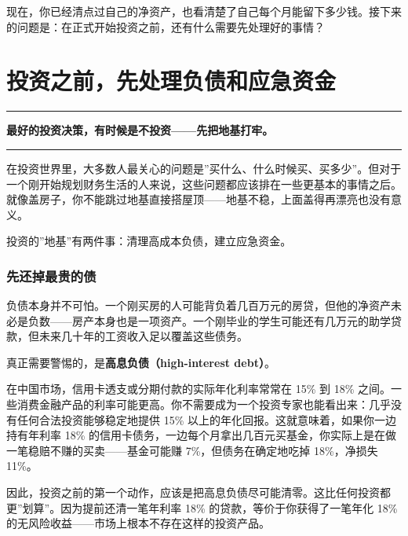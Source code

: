 \documentclass[a4paper,11pt,oneside,fontset=none,UTF8,zihao=-4]{ctexbook}
\begin{document}
现在，你已经清点过自己的净资产，也看清楚了自己每个月能留下多少钱。接下来的问题是：在正式开始投资之前，还有什么需要先处理好的事情？

\newpage

\chapter{投资之前，先处理负债和应急资金}\label{ux6295ux8d44ux4e4bux524dux5148ux5904ux7406ux8d1fux503aux548cux5e94ux6025ux8d44ux91d1}

\begin{center}{\color{dh-bronze}\rule{0.2\textwidth}{0.5pt}}\end{center}

\begin{dhquote}
\textbf{最好的投资决策，有时候是不投资------先把地基打牢。}
\end{dhquote}

\begin{center}{\color{dh-bronze}\rule{0.2\textwidth}{0.5pt}}\end{center}

在投资世界里，大多数人最关心的问题是''买什么、什么时候买、买多少''。但对于一个刚开始规划财务生活的人来说，这些问题都应该排在一些更基本的事情之后。就像盖房子，你不能跳过地基直接搭屋顶------地基不稳，上面盖得再漂亮也没有意义。

投资的''地基''有两件事：清理高成本负债，建立应急资金。

\subsection{先还掉最贵的债}\label{ux5148ux8fd8ux6389ux6700ux8d35ux7684ux503a}

负债本身并不可怕。一个刚买房的人可能背负着几百万元的房贷，但他的净资产未必是负数------房产本身也是一项资产。一个刚毕业的学生可能还有几万元的助学贷款，但未来几十年的工资收入足以覆盖这些债务。

真正需要警惕的，是\textbf{高息负债（high-interest debt）}。

在中国市场，信用卡透支或分期付款的实际年化利率常常在 15\% 到 18\%
之间。一些消费金融产品的利率可能更高。你不需要成为一个投资专家也能看出来：几乎没有任何合法投资能够稳定地提供
15\% 以上的年化回报。这就意味着，如果你一边持有年利率 18\%
的信用卡债务，一边每个月拿出几百元买基金，你实际上是在做一笔稳赔不赚的买卖------基金可能赚
7\%，但债务在确定地吃掉 18\%，净损失 11\%。

因此，投资之前的第一个动作，应该是把高息负债尽可能清零。这比任何投资都更''划算''。因为提前还清一笔年利率
18\% 的贷款，等价于你获得了一笔年化 18\%
的无风险收益------市场上根本不存在这样的投资产品。
\end{document}
